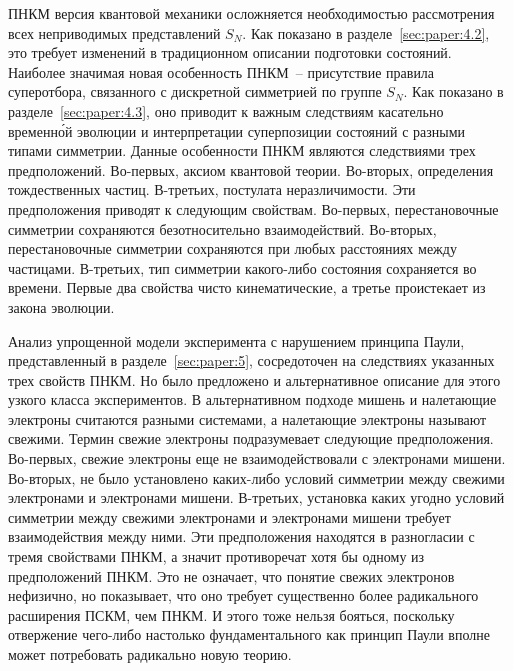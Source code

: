 \documentclass[a4paper, 12pt]{article}
\begin{document}
ПНКМ версия квантовой механики осложняется необходимостью рассмотрения 
всех неприводимых представлений $S_N$. Как показано 
в разделе~\ref{sec:paper:4.2}, это требует изменений в традиционном 
описании подготовки состояний. Наиболее значимая новая особенность 
ПНКМ~-- присутствие правила суперотбора, связанного с дискретной 
симметрией по группе $S_N$. Как показано в разделе~\ref{sec:paper:4.3}, 
оно приводит к важным следствиям касательно временн\'{о}й эволюции 
и интерпретации суперпозиции состояний с разными типами симметрии. 
Данные особенности ПНКМ являются следствиями трех предположений. 
Во-первых, аксиом квантовой теории. Во-вторых, определения тождественных 
частиц. В-третьих, постулата неразличимости. Эти предположения приводят 
к следующим свойствам. Во-первых, перестановочные симметрии сохраняются 
безотносительно взаимодействий. Во-вторых, перестановочные симметрии 
сохраняются при любых расстояниях между частицами. В-третьих, тип 
симметрии какого-либо состояния сохраняется во времени. Первые два 
свойства чисто кинематические, а третье проистекает из закона эволюции.

Анализ упрощенной модели эксперимента с нарушением принципа Паули, 
представленный в разделе~\ref{sec:paper:5}, сосредоточен на следствиях 
указанных трех свойств ПНКМ. Но было предложено и альтернативное 
описание для этого узкого класса экспериментов. В альтернативном подходе 
мишень и налетающие электроны считаются разными системами, а налетающие 
электроны называют свежими. Термин свежие электроны подразумевает 
следующие предположения. Во-первых, свежие электроны еще не 
взаимодействовали с электронами мишени. Во-вторых, не было установлено 
каких-либо условий симметрии между свежими электронами и электронами 
мишени. В-третьих, установка каких угодно условий симметрии между 
свежими электронами и электронами мишени требует взаимодействия между 
ними. Эти предположения находятся в разногласии с тремя свойствами ПНКМ, 
а значит противоречат хотя бы одному из предположений ПНКМ. Это не 
означает, что понятие свежих электронов нефизично, но показывает, что 
оно требует существенно более радикального расширения ПСКМ, чем ПНКМ. 
И этого тоже нельзя бояться, поскольку отвержение чего-либо настолько 
фундаментального как принцип Паули вполне может потребовать радикально 
новую теорию.
\end{document}
